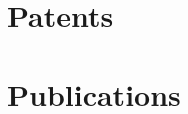 \documentclass[]{deedy-resume-openfont}
\begin{document}
\begin{minipage}[t]{0.66\textwidth}

\section{Patents}
\renewcommand\refname{\vskip - 0.8cm} %


\nocite{*}


\section{Publications} 
\renewcommand\refname{\vskip - 0.8cm} %


\nocite{*}

\end{minipage} 
\end{document}
